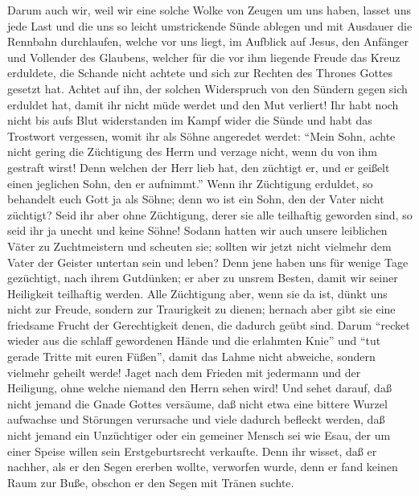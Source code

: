  Darum auch wir, weil wir eine solche Wolke von Zeugen um
uns haben, lasset uns jede Last und die uns so leicht umstrickende Sünde
ablegen und mit Ausdauer die Rennbahn durchlaufen, welche vor uns liegt,
 im Aufblick auf Jesus, den Anfänger und Vollender des
Glaubens, welcher für die vor ihm liegende Freude das Kreuz erduldete,
die Schande nicht achtete und sich zur Rechten des Thrones Gottes
gesetzt hat.  Achtet auf ihn, der solchen Widerspruch von
den Sündern gegen sich erduldet hat, damit ihr nicht müde werdet und den
Mut verliert!  Ihr habt noch nicht bis aufs Blut
widerstanden im Kampf wider die Sünde  und habt das
Trostwort vergessen, womit ihr als Söhne angeredet werdet: ``Mein Sohn,
achte nicht gering die Züchtigung des Herrn und verzage nicht, wenn du
von ihm gestraft wirst!  Denn welchen der Herr lieb hat,
den züchtigt er, und er geißelt einen jeglichen Sohn, den er aufnimmt.''
 Wenn ihr Züchtigung erduldet, so behandelt euch Gott ja
als Söhne; denn wo ist ein Sohn, den der Vater nicht züchtigt?
 Seid ihr aber ohne Züchtigung, derer sie alle teilhaftig
geworden sind, so seid ihr ja unecht und keine Söhne! 
Sodann hatten wir auch unsere leiblichen Väter zu Zuchtmeistern und
scheuten sie; sollten wir jetzt nicht vielmehr dem Vater der Geister
untertan sein und leben?  Denn jene haben uns für wenige
Tage gezüchtigt, nach ihrem Gutdünken; er aber zu unsrem Besten, damit
wir seiner Heiligkeit teilhaftig werden.  Alle Züchtigung
aber, wenn sie da ist, dünkt uns nicht zur Freude, sondern zur
Traurigkeit zu dienen; hernach aber gibt sie eine friedsame Frucht der
Gerechtigkeit denen, die dadurch geübt sind.  Darum
``recket wieder aus die schlaff gewordenen Hände und die erlahmten
Knie''  und ``tut gerade Tritte mit euren Füßen'', damit
das Lahme nicht abweiche, sondern vielmehr geheilt werde!
 Jaget nach dem Frieden mit jedermann und der Heiligung,
ohne welche niemand den Herrn sehen wird!  Und sehet
darauf, daß nicht jemand die Gnade Gottes versäume, daß nicht etwa eine
bittere Wurzel aufwachse und Störungen verursache und viele dadurch
befleckt werden,  daß nicht jemand ein Unzüchtiger oder
ein gemeiner Mensch sei wie Esau, der um einer Speise willen sein
Erstgeburtsrecht verkaufte.  Denn ihr wisset, daß er
nachher, als er den Segen ererben wollte, verworfen wurde, denn er fand
keinen Raum zur Buße, obschon er den Segen mit Tränen suchte.
